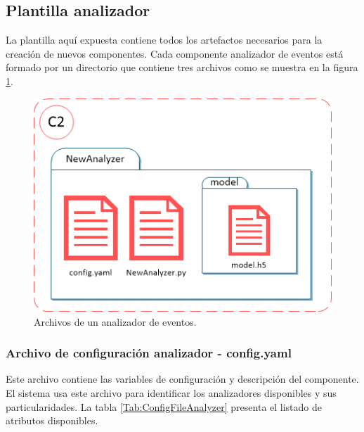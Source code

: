     \subsection{Plantilla analizador}
    \label{sub:TplAnalyzer}
        
        La plantilla aquí expuesta contiene todos los artefactos necesarios para la creación de nuevos componentes. Cada componente analizador de eventos está formado por un directorio que contiene tres archivos como se muestra en la figura \ref{fig:TplAnalyzerFiles}.
    
        \begin{figure}[ht!]
        	\centering
        	\includegraphics[width=0.7\linewidth]{imgs/03-Architecture/03-TplAnalyzerFiles.png}
        	\caption[Archivos de un analizador de eventos]{Archivos de un analizador de eventos.}
    	    \label{fig:TplAnalyzerFiles}
        \end{figure}%
        
        \subsubsection{Archivo de configuración analizador - config.yaml}
        \label{sub2:ConfigFileAnalyzer}
            Este archivo contiene las variables de configuración y descripción del componente. El sistema usa este archivo para identificar los analizadores disponibles y sus particularidades. La tabla \ref{Tab:ConfigFileAnalyzer} presenta el listado de atributos disponibles.

